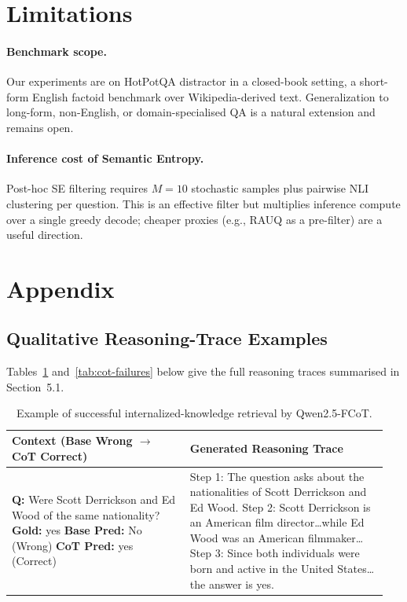 \documentclass[11pt]{article}
\begin{document}
\section*{Limitations}

\paragraph{Benchmark scope.} Our experiments are on HotPotQA distractor in a closed-book setting, a short-form English factoid benchmark over Wikipedia-derived text. Generalization to long-form, non-English, or domain-specialised QA is a natural extension and remains open.

\paragraph{Inference cost of Semantic Entropy.} Post-hoc SE filtering requires $M{=}10$ stochastic samples plus pairwise NLI clustering per question. This is an effective filter but multiplies inference compute over a single greedy decode; cheaper proxies (e.g., RAUQ as a pre-filter) are a useful direction.




\appendix

\section{Appendix}

\subsection{Qualitative Reasoning-Trace Examples}\label{app:qualitative}

Tables~\ref{tab:cot-success} and~\ref{tab:cot-failures} below give the full reasoning traces summarised in Section~5.1.

\begin{table}[H]
\centering
\small
\renewcommand{\arraystretch}{1.2}
\begin{tabular}{|p{0.45\linewidth}|p{0.5\linewidth}|}
\hline
\textbf{Context (Base Wrong $\rightarrow$ CoT Correct)} & \textbf{Generated Reasoning Trace} \\
\hline
\textbf{Q:} Were Scott Derrickson and Ed Wood of the same nationality? \newline
\textbf{Gold:} yes \newline
\textbf{Base Pred:} No (Wrong) \newline
\textbf{CoT Pred:} yes (Correct) &
Step 1: The question asks about the nationalities of Scott Derrickson and Ed Wood. \newline
Step 2: Scott Derrickson is an American film director\dots while Ed Wood was an American filmmaker\dots \newline
Step 3: Since both individuals were born and active in the United States\dots the answer is yes. \\
\hline
\end{tabular}
\caption{Example of successful internalized-knowledge retrieval by Qwen2.5-FCoT.}
\label{tab:cot-success}
\end{table}
\end{document}
